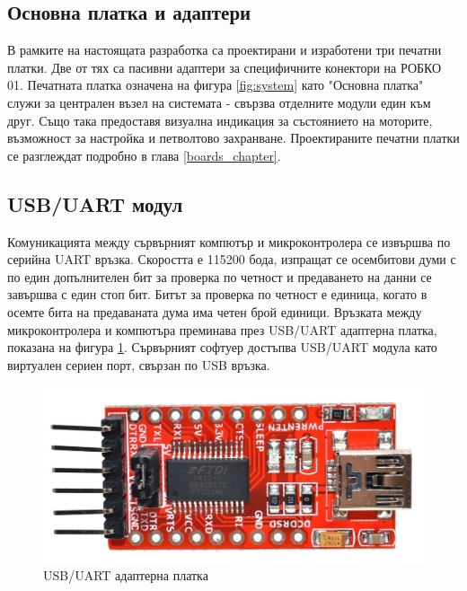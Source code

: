 \subsection{Основна платка и адаптери}
В рамките на настоящата разработка са проектирани и изработени три печатни платки. Две от тях са пасивни адаптери за специфичните конектори на РОБКО 01. Печатната платка означена на фигура \ref{fig:system} като "Основна платка" служи за централен възел на системата - свързва отделните модули един към друг. Също така предоставя визуална индикация за състоянието на моторите, възможност за настройка и петволтово захранване. Проектираните печатни платки се разглеждат подробно в глава \ref{boards_chapter}.
\subsection{USB/UART модул}
Комуникацията между сървърният компютър и микроконтролера се извършва по серийна UART връзка. Скоростта е 115200 бода, изпращат се осембитови думи с по един допълнителен бит за проверка по четност и предаването на данни се завършва с един стоп бит. Битът за проверка по четност е единица, когато в осемте бита на предаваната дума има четен брой единици. Връзката между микроконтролера и компютъра преминава през USB/UART адаптерна платка, показана на фигура \ref{fig:usb_uart}. Сървърният софтуер достъпва USB/UART модула като виртуален сериен порт, свързан по USB връзка.
\begin{figure}[!htb]
    \centering
    \includegraphics[width=0.75\linewidth]{pictures/USB_to_UART.jpg}
    \caption{USB/UART адаптерна платка}
    \label{fig:usb_uart}
\end{figure}
\FloatBarrier
